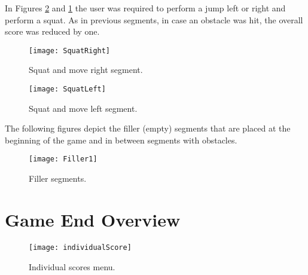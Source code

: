 In Figures \ref{fig:squatleft} and \ref{fig:squatright} the user was required to perform a jump left or right and perform a squat. As in previous segments, in case an obstacle was hit, the overall score was reduced by one.\\
\begin{figure}[h]
    \centering
    \texttt{[image: SquatRight]}
    \caption{Squat and move right segment.}
    \label{fig:squatright}
\end{figure}
\begin{figure}[h]
    \centering
    \texttt{[image: SquatLeft]}
    \caption{Squat and move left segment.}
    \label{fig:squatleft}
\end{figure}

The following figures depict the filler (empty) segments that are placed at the beginning of the game and in between segments with obstacles.

\begin{figure}[h]
    \centering
    \texttt{[image: Filler1]}
    \caption{Filler segments.}
    \label{fig:filler}
\end{figure}

\section{Game End Overview}
\label{endgamelabel}


\begin{figure}[h]
    \centering
    \texttt{[image: individualScore]}
    \caption{Individual scores menu.}
    \label{fig:individualScore}
\end{figure}
